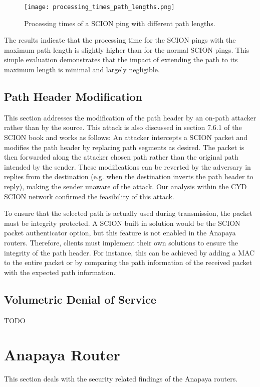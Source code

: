 \begin{figure}[h]
    \centering
    \texttt{[image: processing\_times\_path\_lengths.png]}
    \caption{Processing times of a SCION ping with different path lengths.}
    \label{fig:path_extension}
\end{figure}

The results indicate that the processing time for the SCION pings with the maximum path length is slightly higher than for the normal SCION pings.
This simple evaluation demonstrates that the impact of extending the path to its maximum length is minimal and largely negligible.


\subsection{Path Header Modification}
This section addresses the modification of the path header by an on-path attacker rather than by the source.
This attack is also discussed in section 7.6.1 of the SCION book \cite{Perrig2022} and works as follows:
An attacker intercepts a SCION packet and modifies the path header by replacing path segments as desired.
The packet is then forwarded along the attacker chosen path rather than the original path intended by the sender.
These modifications can be reverted by the adversary in replies from the destination (e.g. when the destination inverts the path header to reply), making the sender unaware of the attack.
Our analysis within the CYD SCION network confirmed the feasibility of this attack.

To ensure that the selected path is actually used during transmission, the packet must be integrity protected.
A SCION built in solution would be the SCION packet authenticator option, but this feature is not enabled in the Anapaya routers.
Therefore, clients must implement their own solutions to ensure the integrity of the path header.
For instance, this can be achieved by adding a MAC to the entire packet or by comparing the path information of the received packet with the expected path information.


\subsection{Volumetric Denial of Service}
TODO







\section{Anapaya Router}
This section deals with the security related findings of the Anapaya routers.


